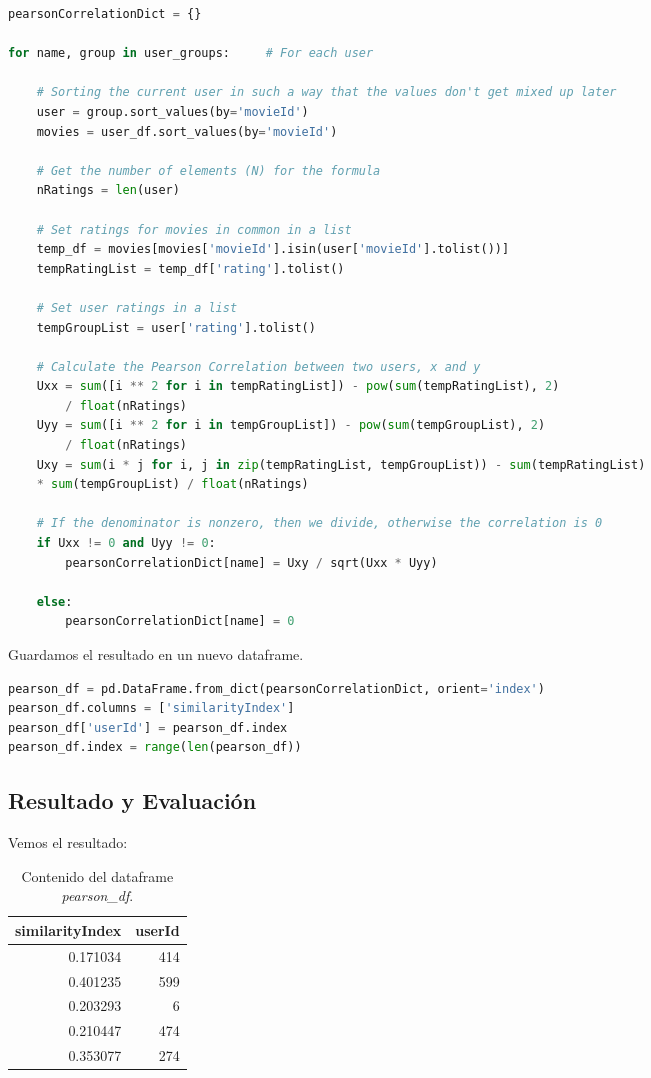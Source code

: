 \documentclass{uimppracticas}
\begin{document}
\begin{lstlisting}[language=python]
pearsonCorrelationDict = {}

for name, group in user_groups:     # For each user
	
	# Sorting the current user in such a way that the values don't get mixed up later
	user = group.sort_values(by='movieId')
	movies = user_df.sort_values(by='movieId')
	
	# Get the number of elements (N) for the formula
	nRatings = len(user)
	
	# Set ratings for movies in common in a list
	temp_df = movies[movies['movieId'].isin(user['movieId'].tolist())]
	tempRatingList = temp_df['rating'].tolist()
	
	# Set user ratings in a list
	tempGroupList = user['rating'].tolist()
	
	# Calculate the Pearson Correlation between two users, x and y
	Uxx = sum([i ** 2 for i in tempRatingList]) - pow(sum(tempRatingList), 2) 
		/ float(nRatings)
	Uyy = sum([i ** 2 for i in tempGroupList]) - pow(sum(tempGroupList), 2) 
		/ float(nRatings)
	Uxy = sum(i * j for i, j in zip(tempRatingList, tempGroupList)) - sum(tempRatingList)  
	* sum(tempGroupList) / float(nRatings)
	
	# If the denominator is nonzero, then we divide, otherwise the correlation is 0
	if Uxx != 0 and Uyy != 0:
		pearsonCorrelationDict[name] = Uxy / sqrt(Uxx * Uyy)
	
	else:
		pearsonCorrelationDict[name] = 0
\end{lstlisting}

Guardamos el resultado en un nuevo dataframe.

\begin{lstlisting}[language=python]
pearson_df = pd.DataFrame.from_dict(pearsonCorrelationDict, orient='index')
pearson_df.columns = ['similarityIndex']
pearson_df['userId'] = pearson_df.index
pearson_df.index = range(len(pearson_df))
\end{lstlisting}

\newpage

\subsection{Resultado y Evaluación}



Vemos el resultado:

\begin{table}[h]
	\centering
	\begin{tabular}{rr}
		\toprule
		similarityIndex &  userId \\
		\midrule
		0.171034 &     414 \\
		0.401235 &     599 \\
		0.203293 &       6 \\
		0.210447 &     474 \\
		0.353077 &     274 \\
		\bottomrule
	\end{tabular}
	\caption{Contenido del dataframe \textit{pearson\_df}.}
	\label{pearson}
\end{table}
\end{document}
